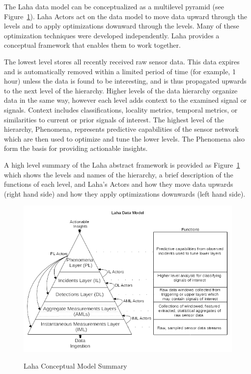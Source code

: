 The Laha data model can be conceptualized as a multilevel pyramid (see Figure~\ref{laha-abstract-overview}). Laha Actors act on the data model to move data upward through the levels and to apply optimizations downward through the levels. Many of these optimization techniques were developed independently. Laha provides a conceptual framework that enables them to work together.

The lowest level stores all recently received raw sensor data. This data expires and is automatically removed within a limited period of time (for example, 1 hour) unless the data is found to be interesting, and is thus propagated upwards to the next level of the hierarchy.  Higher levels of the data hierarchy organize data in the same way, however each level adds context to the examined signal or signals. Context includes classifications, locality metrics, temporal metrics, or similarities to current or prior signals of interest. The highest level of the hierarchy, Phenomena, represents predictive capabilities of the sensor network which are then used to optimize and tune the lower levels. The Phenomena also form the basis for providing actionable insights.

A high level summary of the Laha abstract framework is provided as Figure~\ref{laha-abstract-overview} which shows the levels and names of the hierarchy, a brief description of the functions of each level, and Laha's Actors and how they move data upwards (right hand side) and how they apply optimizations downwards (left hand side).

\begin{figure}
	\caption{Laha Conceptual Model Summary}
	\centering
	\includegraphics{figures/laha_abstract_overview.png}
	\label{laha-abstract-overview}
\end{figure}

